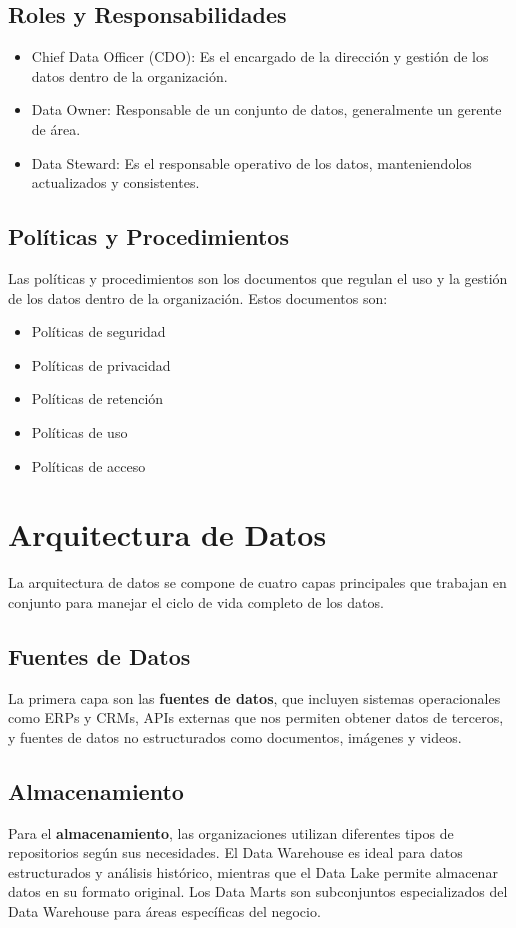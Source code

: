 \documentclass[12pt]{article}
\begin{document}
\subsection{Roles y Responsabilidades}
\begin{itemize}
    \item Chief Data Officer (CDO): Es el encargado de la dirección y gestión de los datos dentro de la organización.
    \item Data Owner: Responsable de un conjunto de datos, generalmente un gerente de área.
    \item Data Steward: Es el responsable operativo de los datos, manteniendolos actualizados y consistentes.
\end{itemize}

\subsection{Políticas y Procedimientos}
Las políticas y procedimientos son los documentos que regulan el uso y la gestión de los datos dentro de la organización. Estos documentos son:
\begin{itemize}
    \item Políticas de seguridad
    \item Políticas de privacidad
    \item Políticas de retención
    \item Políticas de uso
    \item Políticas de acceso
\end{itemize}

\section{Arquitectura de Datos}
La arquitectura de datos se compone de cuatro capas principales que trabajan en conjunto para manejar el ciclo de vida completo de los datos.

\subsection{Fuentes de Datos}
La primera capa son las \textbf{fuentes de datos}, que incluyen sistemas operacionales como ERPs y CRMs, APIs externas que nos permiten obtener datos de terceros, y fuentes de datos no estructurados como documentos, imágenes y videos.

\subsection{Almacenamiento}
Para el \textbf{almacenamiento}, las organizaciones utilizan diferentes tipos de repositorios según sus necesidades. El Data Warehouse es ideal para datos estructurados y análisis histórico, mientras que el Data Lake permite almacenar datos en su formato original. Los Data Marts son subconjuntos especializados del Data Warehouse para áreas específicas del negocio.
\end{document}
